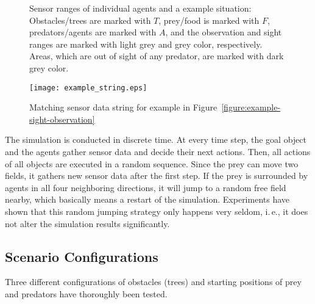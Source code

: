 \begin{figure}[ht]
	\hfill
  \hfill
  \caption{Sensor ranges of individual agents and a example situation: Obstacles/trees are marked with $T$, prey/food is marked with $F$, predators/agents are marked with $A$, and the observation and sight ranges are marked with light grey and grey color, respectively. Areas, which are out of sight of any predator, are marked with dark grey color.}
  \label{figure:sight-directions}
\end{figure}

\begin{figure}[ht]
	\centerline{
		\texttt{[image: example\_string.eps]}
	}
	\caption{Matching sensor data string for example in Figure~\ref{figure:example-sight-observation}}
	\label{figure:example-string}
\end{figure}


The simulation is conducted in discrete time. At every time step, the goal object and the agents gather sensor data and decide their next actions. Then, all actions of all objects are executed in a random sequence. Since the prey can move two fields, it gathers new sensor data after the first step. If the prey is surrounded by agents in all four neighboring directions, it will jump to a random free field nearby, which basically means a restart of the simulation. Experiments have shown that this random jumping strategy only happens very seldom, i.\,e., it does not alter the simulation results significantly.

\subsection{Scenario Configurations}
\label{subsection:scenario-obstacle}

Three different configurations of obstacles (trees) and star\-ting positions of prey and predators have thoroughly been tested. 

